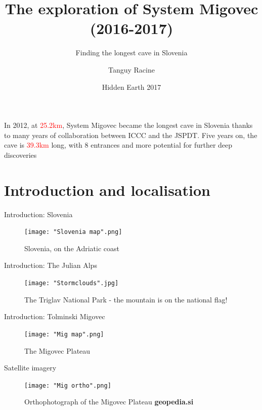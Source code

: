 \documentclass[10pt]{beamer}
\title{The exploration of System Migovec (2016-2017)}
\subtitle{Finding the longest cave in Slovenia}
\date{Hidden Earth 2017}
\author{Tanguy Racine}
\institute{Imperial College Caving Club, Jamarska Sekcija Planinsko Društvo Tolmin \\}
\begin{document}
\maketitle
\begin{frame}[standout]
\begin{center}In 2012, at \textcolor{red}{25.2km}, System Migovec became the longest cave in Slovenia thanks to many years of collaboration between ICCC and the JSPDT. Five years on, the cave is \textcolor{red}{39.3km} long, with 8 entrances and more potential for further deep discoveries\end{center}
\end{frame}

  
\section{Introduction and localisation}

\begin{frame}{Introduction: Slovenia}
    \begin{figure}[!ht]
    \centering
    \texttt{[image: "Slovenia map".png]}
    \caption{Slovenia, on the Adriatic coast}
    \end{figure}
\end{frame}

\begin{frame}{Introduction: The Julian Alps}
    \begin{figure}[!ht]
    \centering
    \texttt{[image: "Stormclouds".jpg]}
    \caption{The Triglav National Park - the mountain is on the national flag!}
    \end{figure}
\end{frame}

\begin{frame}{Introduction: Tolminski Migovec}
    \begin{figure}[!ht]
    \centering
    \texttt{[image: "Mig map".png]}
    \caption{The Migovec Plateau}
    \end{figure}
\end{frame}

\begin{frame}{Satellite imagery}
    \begin{figure}[!ht]
    \centering
    \texttt{[image: "Mig ortho".png]}
    \caption{Orthophotograph of the Migovec Plateau \textbf{geopedia.si}}
    \end{figure}
\end{frame}
\end{document}
